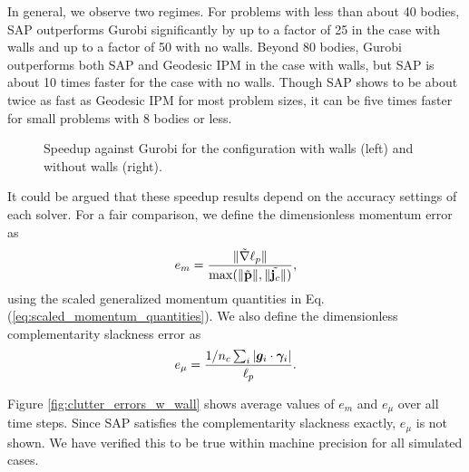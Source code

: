 In general, we observe two regimes. For problems with less than about 40 bodies,
SAP outperforms Gurobi significantly by up to a factor of 25 in the case with
walls and up to a factor of 50 with no walls. Beyond 80 bodies, Gurobi
outperforms both SAP and Geodesic IPM in the case with walls, but SAP is about
10 times faster for the case with no walls. Though SAP shows to be about twice
as fast as Geodesic IPM for most problem sizes, it can be five times faster for
small problems with 8 bodies or less.
\begin{figure}[!h]
	\centering
	\caption{\label{fig:clutter_speedup} 
	Speedup against Gurobi for the configuration with walls (left) and without
	walls (right).}
\end{figure}

It could be argued that these speedup results depend on the accuracy settings of
each solver. For a fair comparison, we define the dimensionless momentum error
as
\begin{equation}
	e_m = \frac{\Vert\tilde{\nabla}\ell_p\Vert}{\max(\Vert\tilde{\mf{p}}\Vert,\Vert\tilde{\mf{j}_c}\Vert)},
	\label{eq:momentum_error}
\end{equation}
using the scaled generalized momentum quantities in Eq.
(\ref{eq:scaled_momentum_quantities}). We also define the dimensionless
complementarity slackness error as
\begin{equation}
	e_\mu = \frac{1/n_c\sum_i|\bm{g}_i\cdot\bgamma_i|}{\ell_p}.
	\label{eq:slackness_error}
\end{equation}

Figure \ref{fig:clutter_errors_w_wall} shows average values of $e_m$ and $e_\mu$
over all time steps. Since SAP satisfies the complementarity slackness exactly,
$e_\mu$ is not shown. We have verified this to be true within machine precision
for all simulated cases.

